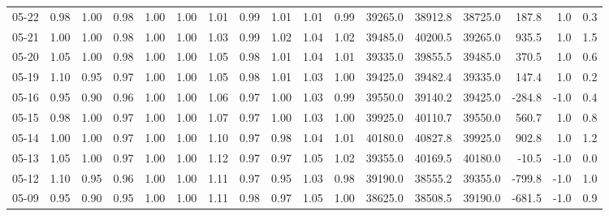 \begin{threeparttable}
{\begin{tabular}{lrrrrrrrrrrrrrrrr}
  05-22 &   0.98 &   1.00 &         0.98 &     1.00 &           1.00 &        1.01 &        0.99 &        1.01 &          1.01 &          0.99 & 39265.0 & 38912.8 & 38725.0 &      187.8 &                      1.0 &                 0.3 \\
  05-21 &   1.00 &   1.00 &         0.98 &     1.00 &           1.00 &        1.03 &        0.99 &        1.02 &          1.04 &          1.02 & 39485.0 & 40200.5 & 39265.0 &      935.5 &                      1.0 &                 1.5 \\
  05-20 &   1.05 &   1.00 &         0.98 &     1.00 &           1.00 &        1.05 &        0.98 &        1.01 &          1.04 &          1.01 & 39335.0 & 39855.5 & 39485.0 &      370.5 &                      1.0 &                 0.6 \\
  05-19 &   1.10 &   0.95 &         0.97 &     1.00 &           1.00 &        1.05 &        0.98 &        1.01 &          1.03 &          1.00 & 39425.0 & 39482.4 & 39335.0 &      147.4 &                      1.0 &                 0.2 \\
  05-16 &   0.95 &   0.90 &         0.96 &     1.00 &           1.00 &        1.06 &        0.97 &        1.00 &          1.03 &          0.99 & 39550.0 & 39140.2 & 39425.0 &     -284.8 &                     -1.0 &                 0.4 \\
  05-15 &   0.98 &   1.00 &         0.97 &     1.00 &           1.00 &        1.07 &        0.97 &        1.00 &          1.03 &          1.00 & 39925.0 & 40110.7 & 39550.0 &      560.7 &                      1.0 &                 0.8 \\
  05-14 &   1.00 &   1.00 &         0.97 &     1.00 &           1.00 &        1.10 &        0.97 &        0.98 &          1.04 &          1.01 & 40180.0 & 40827.8 & 39925.0 &      902.8 &                      1.0 &                 1.2 \\
  05-13 &   1.05 &   1.00 &         0.97 &     1.00 &           1.00 &        1.12 &        0.97 &        0.97 &          1.05 &          1.02 & 39355.0 & 40169.5 & 40180.0 &      -10.5 &                     -1.0 &                 0.0 \\
  05-12 &   1.10 &   0.95 &         0.96 &     1.00 &           1.00 &        1.11 &        0.97 &        0.95 &          1.03 &          0.98 & 39190.0 & 38555.2 & 39355.0 &     -799.8 &                     -1.0 &                 1.0 \\
  05-09 &   0.95 &   0.90 &         0.95 &     1.00 &           1.00 &        1.11 &        0.98 &        0.97 &          1.05 &          1.00 & 38625.0 & 38508.5 & 39190.0 &     -681.5 &                     -1.0 &                 0.9 \\

\end{tabular}}
\end{threeparttable}
